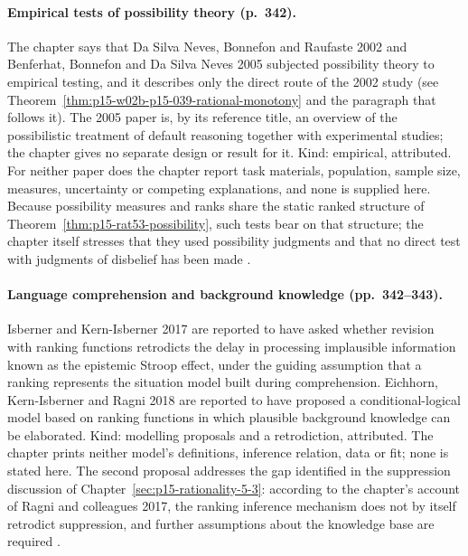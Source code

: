 \paragraph{Empirical tests of possibility theory (p.~342).}
The chapter says that Da Silva Neves, Bonnefon and Raufaste 2002 and
Benferhat, Bonnefon and Da Silva Neves 2005 subjected possibility theory to
empirical testing, and it describes only the direct route of the 2002 study
(see Theorem~\ref{thm:p15-w02b-p15-039-rational-monotony} and the paragraph
that follows it).  The 2005 paper is, by its reference title, an overview of
the possibilistic treatment of default reasoning together with experimental
studies; the chapter gives no separate design or result for it.  Kind:
empirical, attributed.  For neither paper does the chapter report task
materials, population, sample size, measures, uncertainty or competing
explanations, and none is supplied here.  Because possibility measures and
ranks share the static ranked structure of
Theorem~\ref{thm:p15-rat53-possibility}, such tests bear on that structure;
the chapter itself stresses that they used possibility judgments and that no
direct test with judgments of disbelief has been made
\parencite[pp.~342, 344]{KernIsbernerSkovgaardOlsenSpohn2021Ranking}.

\paragraph{Language comprehension and background knowledge (pp.~342--343).}
Isberner and Kern-Isberner 2017 are reported to have asked whether revision
with ranking functions retrodicts the delay in processing implausible
information known as the epistemic Stroop effect, under the guiding
assumption that a ranking represents the situation model built during
comprehension.  Eichhorn, Kern-Isberner and Ragni 2018 are reported to have
proposed a conditional-logical model based on ranking functions in which
plausible background knowledge can be elaborated.  Kind: modelling proposals
and a retrodiction, attributed.  The chapter prints neither model's
definitions, inference relation, data or fit; none is stated here.  The
second proposal addresses the gap identified in the suppression discussion of
Chapter~\ref{sec:p15-rationality-5-3}: according to the chapter's account of Ragni and colleagues 2017, the
ranking inference mechanism does not by itself retrodict suppression, and
further assumptions about the knowledge base are required
\parencite[pp.~342--343]{KernIsbernerSkovgaardOlsenSpohn2021Ranking}.

